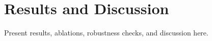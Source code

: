 \section{Results and Discussion}

Present results, ablations, robustness checks, and discussion here.
